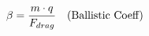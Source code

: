 \documentclass[preview]{standalone}
\begin{document}
\begin{align*}
\special{dvisvgm:raw <g id='unique000'>}\beta = \frac{m \cdot q}{F_{drag}} \quad \text{(Ballistic Coeff)}\special{dvisvgm:raw </g>}
\end{align*}
\end{document}
